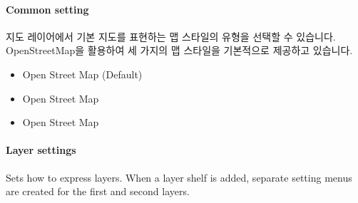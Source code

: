 \documentclass[letterpaper,10pt,english]{sphinxmanual}
\begin{document}
\paragraph{Common setting}
\label{\detokenize{discovery/part04/map_chart:id6}}
지도 레이어에서 기본 지도를 표현하는 맵 스타일의 유형을 선택할 수 있습니다. OpenStreetMap을 활용하여 세 가지의 맵 스타일을 기본적으로 제공하고 있습니다.
\begin{quote}

\begin{figure}[H]
\centering

\noindent{}
\end{figure}
\end{quote}
\begin{itemize}
\item {} 
Open Street Map  (Default)

\item {} 
Open Street Map 

\item {} 
Open Street Map 

\end{itemize}


\paragraph{Layer settings}
\label{\detokenize{discovery/part04/map_chart:id7}}
Sets how to express layers. When a layer shelf is added, separate setting menus are created for the first and second layers.
\end{document}
